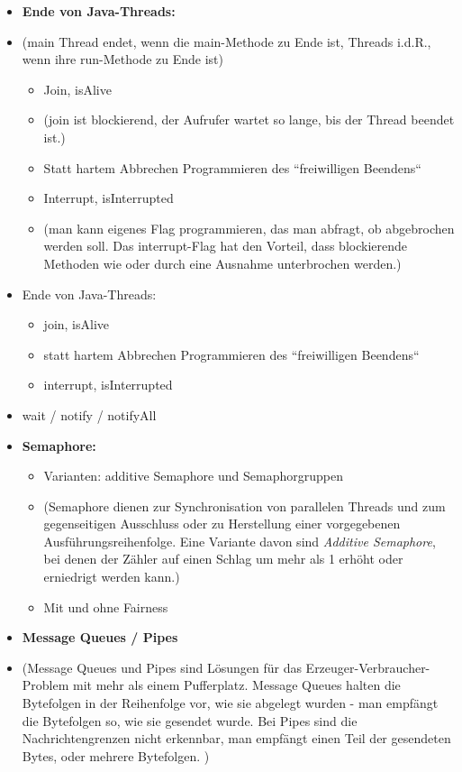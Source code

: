 \begin{itemize}
        \item \textbf{Ende von Java-Threads:}
        \item[] (main Thread endet, wenn die main-Methode zu Ende ist, Threads i.d.R., wenn ihre run-Methode zu Ende ist)
        \begin{itemize}
            \item Join, isAlive
            \item[] (join ist blockierend, der Aufrufer wartet so lange, bis der Thread beendet ist.)
            \item Statt hartem Abbrechen Programmieren des ``freiwilligen Beendens``
            \item Interrupt, isInterrupted
            \item[] (man kann eigenes Flag programmieren, das man abfragt, ob abgebrochen werden soll. Das interrupt-Flag hat den Vorteil, dass blockierende Methoden wie  oder  durch eine Ausnahme unterbrochen werden.)
        \end{itemize}

        \item Ende von Java-Threads:
        \begin{itemize}
            \item join, isAlive
            \item statt hartem Abbrechen Programmieren des ``freiwilligen Beendens``
            \item interrupt, isInterrupted
        \end{itemize}
        \item wait / notify / notifyAll

        \item \textbf{Semaphore:}
        \begin{itemize}
            \item Varianten: additive Semaphore und Semaphorgruppen
            \item[] (Semaphore dienen zur Synchronisation von parallelen Threads und zum gegenseitigen Ausschluss oder zu Herstellung einer vorgegebenen Ausführungsreihenfolge.
            Eine Variante davon sind \textit{Additive Semaphore}, bei denen der Zähler auf einen Schlag um mehr als 1 erhöht oder erniedrigt werden kann.)
            \item Mit und ohne Fairness
        \end{itemize}

        \item \textbf{Message Queues / Pipes}
        \item[] (Message Queues und Pipes sind Lösungen für das Erzeuger-Verbraucher-Problem mit mehr als einem Pufferplatz. Message Queues halten die Bytefolgen in der Reihenfolge vor, wie sie abgelegt wurden - man empfängt die Bytefolgen so, wie sie gesendet wurde. Bei Pipes sind die Nachrichtengrenzen nicht erkennbar, man empfängt einen Teil der gesendeten Bytes, oder mehrere Bytefolgen. )


\end{itemize}
